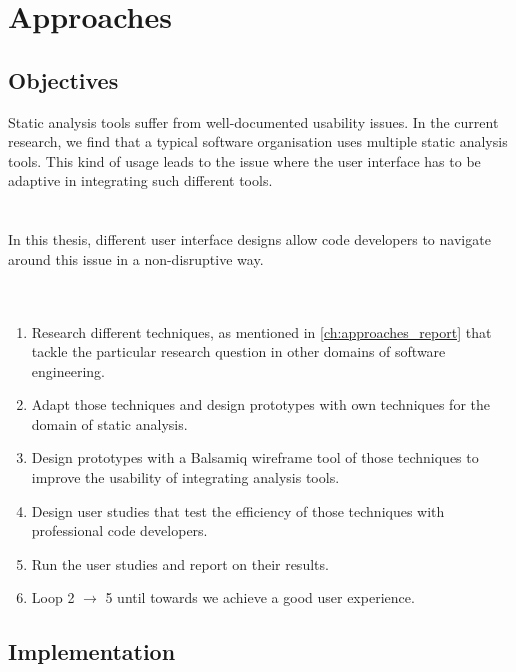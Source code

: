 \chapter{Approaches}
\label{ch:approaches_report}

\section{Objectives}
\label{ch:objectives_report}

Static analysis tools suffer from well-documented usability issues. \cite{CB16,JSMB13} In the current research, we find that a typical software organisation uses multiple static analysis tools. This kind of usage leads to the issue where the user interface has to be adaptive in integrating such different tools. \\ \\ \\


In this thesis, different user interface designs allow code developers to navigate around this issue in a non-disruptive way. \\ \\ \\

\begin{enumerate}
	
	\item  Research different techniques, as mentioned in \autoref{ch:approaches_report} that tackle the particular research question in other domains of software engineering.
	
	\item  Adapt those techniques and design prototypes with own techniques for the domain of static analysis.
	
	\item  Design prototypes with a Balsamiq wireframe tool \cite{B} of those techniques to improve the usability of integrating analysis tools.
	
	\item  Design user studies that test the efficiency of those techniques with professional code developers.
	
	\item  Run the user studies and report on their results.
	
	\item  Loop 2 $\rightarrow$ 5 until towards we achieve a good user experience.
\end{enumerate}


\section{Implementation}

